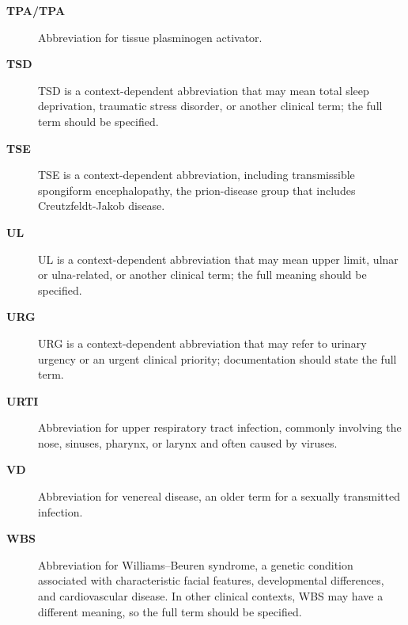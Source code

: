 \begin{description}
\item[\textbf{TPA/TPA}] Abbreviation for tissue plasminogen activator.

\item[\textbf{TSD}] TSD is a context-dependent abbreviation that may mean total sleep deprivation, traumatic stress disorder, or another clinical term; the full term should be specified.

\item[\textbf{TSE}] TSE is a context-dependent abbreviation, including transmissible spongiform encephalopathy, the prion-disease group that includes Creutzfeldt-Jakob disease.

\item[\textbf{UL}] UL is a context-dependent abbreviation that may mean upper limit, ulnar or ulna-related, or another clinical term; the full meaning should be specified.

\item[\textbf{URG}] URG is a context-dependent abbreviation that may refer to urinary urgency or an urgent clinical priority; documentation should state the full term.

\item[\textbf{URTI}] Abbreviation for upper respiratory tract infection, commonly involving the nose, sinuses, pharynx, or larynx and often caused by viruses.

\item[\textbf{VD}] Abbreviation for venereal disease, an older term for a sexually transmitted infection.

\item[\textbf{WBS}] Abbreviation for Williams--Beuren syndrome, a genetic condition associated with characteristic facial features, developmental differences, and cardiovascular disease. In other clinical contexts, WBS may have a different meaning, so the full term should be specified.
\end{description}
